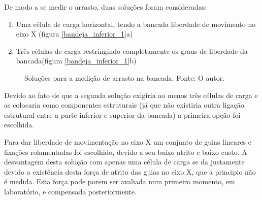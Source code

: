 De modo a se medir o arrasto, duas soluções foram consideradas: 

\begin{enumerate}
    \item Uma célula de carga horizontal, tendo a bancada liberdade de movimento no eixo X (figura \ref{bandeja_inferior_1}a)
    \item Três células de carga restringindo completamente os graus de liberdade da bancada(figura \ref{bandeja_inferior_1}b)
\end{enumerate}

\begin{figure}[!ht]
    \centering
    \caption{Soluções para a medição de arrasto na bancada. Fonte: O autor.}
        \label{bandeja_inferior_1}
        \qquad
        \label{bandeja_inferior_2}
\end{figure}

Devido ao fato de que a segunda solução exigiria ao menos três células de carga e as colocaria como componentes estruturais (já que não existiria outra ligação estrutural entre a parte inferior e superior da bancada) a primeira opção foi escolhida.

Para dar liberdade de movimentação no eixo X um conjunto de guias lineares e fixações rolamentadas foi escolhido, devido a seu baixo atrito e baixo custo. A desvantagem desta solução com apenas uma célula de carga se da justamente devido a existência desta força de atrito das guias no eixo X, que a principio não é medida. Esta força pode porem ser avaliada num primeiro momento, em laboratório, e compensada posteriormente.
    
